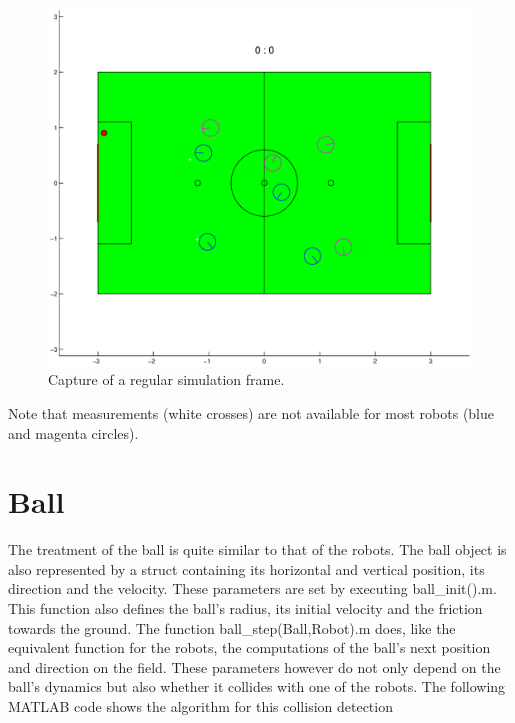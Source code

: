 \begin{figure}[htbp]
	\centering
    	\includegraphics[width=12cm]{./2_Simulation/plot_robots}
  	\caption{Capture of a regular simulation frame.}
  	\label{Plot_robots}
\end{figure}

Note that measurements (white crosses) are not available for most robots (blue and magenta circles).


\section{Ball}

The treatment of the ball is quite similar to that of the robots. The ball object is also represented by a struct containing its horizontal and vertical position, its direction and the velocity. These parameters are set by executing {\selectfont ball\_init().m}. This function also defines the ball's radius, its initial velocity and the friction towards the ground. The function {\selectfont ball\_step(Ball,Robot).m} does, like the equivalent function for the robots, the computations of the ball's next position and direction on the field. These parameters however do not only depend on the ball's dynamics but also whether it collides with one of the robots. The following MATLAB code shows the algorithm for this collision detection


\parskip 20pt

